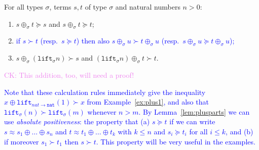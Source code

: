 \documentclass[a4paper,UKenglish,cleveref,autoref,numberwithinsect]{lipics-v2019}
\theoremstyle{definition}
\newcommand{\arrtype}{\rightarrow}
\newcommand{\nat}{\mathtt{nat}}
\newcommand{\lift}{\mathtt{lift}}
\newcommand{\CK}[1]{\textcolor{violet}{CK: #1}}
\newcommand{\CKchange}[1]{\textcolor{blue}{#1}}
\begin{document}
\begin{lemma}\label{lem:plusparts}
For all types $\sigma$, terms $s,t$ of type $\sigma$ and natural
numbers $n > 0$:
\begin{enumerate}
\item\label{lem:plusparts:removefromsucceq}
  $s \oplus_{\sigma} t \succeq s$ and $s \oplus_{\sigma} t \succeq
  t$;
\item \CKchange{if $s \succ t$ (resp.~$s \succeq t$) then also
  $s \oplus_{\sigma} u \succ t \oplus_{\sigma} u$ (resp.~$s \oplus_{
  \sigma} u \succeq t \oplus_{\sigma} u$);}
\item $s \oplus_{\sigma} (\lift_{\sigma} n) \succ s$ and
  $(\lift_{\sigma} n) \oplus_{\sigma} t \succ t$.
\end{enumerate}
\end{lemma}

\CK{This addition, too, will need a proof!}

\CKchange{Note that these calculation rules immediately give the
inequality $x \oplus \lift_{nat \arrtype \nat}(1) \succ x$ from
Example~\ref{ex:plus1}, and also that $\lift_\sigma(n) \succ
\lift_\sigma(m)$ whenever $n > m$.  By Lemma~\ref{lem:plusparts} we
can use \emph{absolute positiveness}: the property that
(a) $s \succeq t$ if we can write $s \approx s_1 \oplus \dots \oplus
s_n$ and $t \approx t_1 \oplus \dots \oplus t_k$ with $k \leq n$ and
$s_i \succeq t_i$ for all $i \leq k$, and (b) if moreover $s_1 \succ
t_1$ then $s \succ t$.  This property will be very useful in the
examples.}
\end{document}
